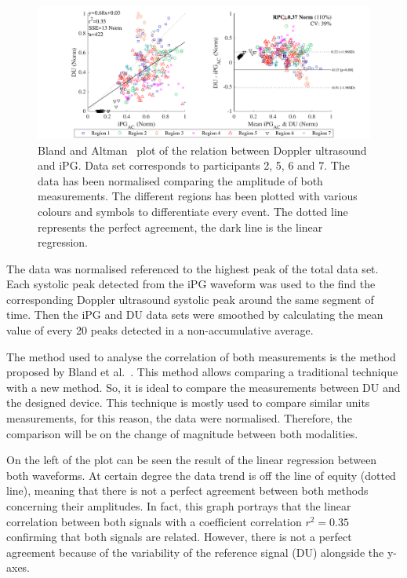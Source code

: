 \begin{figure}[!htpb]
	\includegraphics[width=1\textwidth,keepaspectratio]{figure2}    
	\caption[Bland and Altman plot of the relation between Doppler ultrasound and iPG]{Bland and Altman~\cite{bland1986statistical} plot of the relation between Doppler ultrasound and iPG. Data set corresponds to participants 2, 5, 6 and 7.  The data has been normalised comparing the amplitude of both measurements. The different regions has been plotted with various colours and symbols to differentiate every event. The dotted line represents the perfect agreement, the dark line is the linear regression.}
	\label{fig:corr FWUS}
\end{figure}

The data was normalised referenced to the highest peak of the total data set.  Each systolic peak detected from the iPG waveform was used to the find the corresponding Doppler ultrasound systolic peak around the same segment of time. Then the iPG and DU data sets were smoothed by calculating the mean value of every 20 peaks detected in a non-accumulative average.  

The method used to analyse the correlation of both measurements is the method proposed by Bland et al.~\cite{bland1986statistical}. This method allows comparing a traditional technique with a new method. So, it is ideal to compare the measurements between DU and the designed device. This technique is mostly used to compare similar units measurements, for this reason, the data were normalised. Therefore, the comparison will be on the change of magnitude between both modalities.

On the left of the plot can be seen the result of the linear regression between both waveforms. At certain degree the data trend is off the line of equity (dotted line), meaning that there is not a perfect agreement between both methods concerning their amplitudes. In fact, this graph portrays that the linear correlation between both signals with a coefficient correlation  $r^2 = 0.35$ confirming that both signals are related. However, there is not a perfect agreement because of the variability of the reference signal (DU) alongside the y-axes. 

